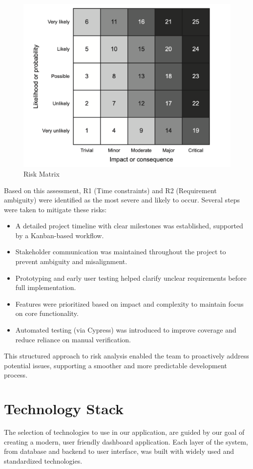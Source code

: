 \begin{figure}[H]
    \centering
    \includegraphics[width=0.8\linewidth]{figures/risk_matrix.png}
    \caption{Risk Matrix \autocite[Figure 6.2]{Sutton2021}}
    \label{fig:risk_matrix}
\end{figure}

Based on this assessment, R1 (Time constraints) and R2 (Requirement ambiguity) were identified as the most severe and likely to occur. Several steps were taken to mitigate these risks:

\begin{itemize}
    \item A detailed project timeline with clear milestones was established, supported by a Kanban-based workflow.
    \item Stakeholder communication was maintained throughout the project to prevent ambiguity and misalignment.
    \item Prototyping and early user testing helped clarify unclear requirements before full implementation.
    \item Features were prioritized based on impact and complexity to maintain focus on core functionality.
    \item Automated testing (via Cypress) was introduced to improve coverage and reduce reliance on manual verification.
\end{itemize}

This structured approach to risk analysis enabled the team to proactively address potential issues, supporting a smoother and more predictable development process.



\section{Technology Stack}
The selection of technologies to use in our application, are guided by our goal of creating a modern, user friendly dashboard application. Each layer of the system, from database and backend to user interface, was built with widely used and standardized technologies.


